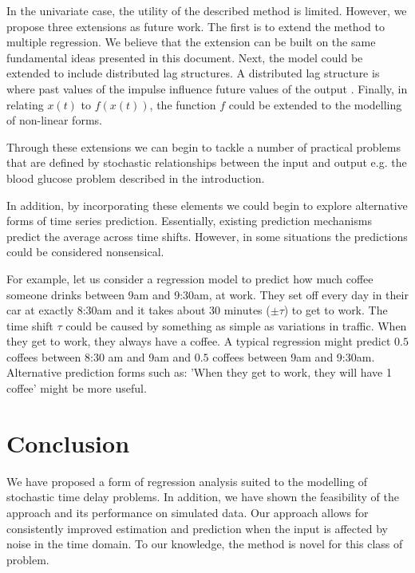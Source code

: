 \documentclass[11pt]{amsart}
\theoremstyle{definition}
\theoremstyle{definition}
\begin{document}
In the univariate case, the utility of the described method is limited. However, we propose three extensions as future work. The first is to extend the method to multiple regression. 
We believe that the extension can be built on the same fundamental ideas presented in this document. Next, the model could be extended to include distributed lag structures. A distributed lag structure is where past values of the impulse influence future values of the output \cite{almon}. Finally, in relating $x(t)$ to $f(x(t))$, the function $f$ could be extended to the modelling of non-linear forms.

Through these extensions we can begin to tackle a number of practical problems that are defined by stochastic relationships between the input and output e.g. the blood glucose problem described in the introduction.

In addition, by incorporating these elements we could begin to explore alternative forms of time series prediction. Essentially, existing prediction mechanisms predict the average across time shifts. However, in some situations the predictions could be considered nonsensical.

For example, let us consider a regression model to predict how much coffee someone drinks between 9am and 9:30am, at work. They set off every day in their car at exactly 8:30am and it takes about 30 minutes ($\pm \tau$) to get to work. The time shift $\tau$ could be caused by something as simple as variations in traffic. When they get to work, they always have a coffee. A typical regression might predict $0.5$ coffees between 8:30 am and 9am and $0.5$ coffees between 9am and 9:30am. Alternative prediction forms such as: 'When they get to work, they will have 1 coffee' might be more useful.


\section{Conclusion}

We have proposed a form of regression analysis suited to the modelling of stochastic time delay problems. In addition, we have shown the feasibility of the approach and its performance on simulated data. Our approach allows for consistently improved estimation and prediction when the input is affected by noise in the time domain. To our knowledge, the method is novel for this class of problem.





\end{document}

